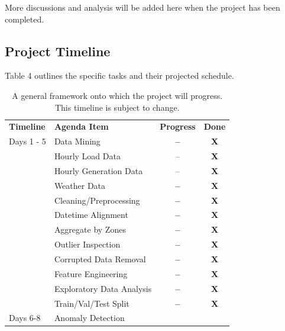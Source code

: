 \documentclass[sigconf]{acmart}
\begin{document}
More discussions and analysis will be added here when the project has been completed.

\subsection{Project Timeline}

Table 4 outlines the specific tasks and their projected schedule.

\begin{table}[hbt!]
\centering
\caption{A general framework onto which the project will progress. This timeline is subject to change.}
\begin{tabular}{ll | c | c}
\toprule
\textbf{Timeline} & \textbf{Agenda Item} & \hfil \textbf{Progress} & \hfil \textbf{Done} \\
\cmidrule(rl){1-1}\cmidrule(rl){2-2}\cmidrule(rl){3-3}\cmidrule(rl){4-4}
  Days 1 - 5 & Data Mining & \textbf{--} & \textbf{X} \\
  \cmidrule(rl){1-4}
   & \hspace{3mm}Hourly Load Data & -- & \textbf{X} \\   
   & \hspace{3mm}Hourly Generation Data & -- & \textbf{X} \\   
   & \hspace{3mm}Weather Data & \textbf{--} & \textbf{X}\\   
   & Cleaning/Preprocessing & \textbf{--} & \textbf{X}\\  
   \cmidrule(rl){2-4} 
   & \hspace{3mm}Datetime Alignment & \textbf{--} & \textbf{X}\\   
   & \hspace{3mm}Aggregate by Zones & \textbf{--} & \textbf{X}\\   
   & \hspace{3mm}Outlier Inspection & \textbf{--} & \textbf{X}\\   
   & \hspace{3mm}Corrupted Data Removal & \textbf{--} & \textbf{X}\\  
   & Feature Engineering & \textbf{--} & \textbf{X}\\  
   & Exploratory Data Analysis & \textbf{--} & \textbf{X}\\  
   \cmidrule(rl){2-4} 
   & Train/Val/Test Split &\textbf{--} & \textbf{X}\\  
   \cmidrule(rl){2-4} 
  Days 6-8 & Anomaly Detection & & \\  

\end{tabular}
\end{table}
\end{document}
